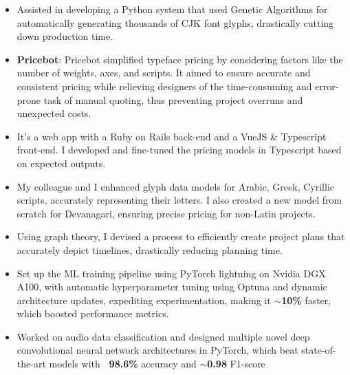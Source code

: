 \documentclass[10pt,a4paper,ragged2e,withhyper]{altacv}
\begin{document}
\begin{paracol}{2}

\begin{itemize}
    \item Assisted in developing a Python system that used Genetic Algorithms for automatically generating thousands of CJK font glyphs, drastically cutting down production time.
    \item \textbf{Pricebot}: Pricebot simplified typeface pricing by considering factors like the number of weights, axes, and scripts. It aimed to ensure accurate and consistent pricing while relieving designers of the time-consuming and error-prone task of manual quoting, thus preventing project overruns and unexpected costs.
    \item It's a web app with a Ruby on Rails back-end and a VueJS \& Typescript front-end. I developed and fine-tuned the pricing models in Typescript based on expected outputs.
    \item My colleague and I enhanced glyph data models for Arabic, Greek, Cyrillic scripts, accurately representing their letters. I also created a new model from scratch for Devanagari, ensuring precise pricing for non-Latin projects.
    \item Using graph theory, I devised a process to efficiently create project plans that accurately depict timelines, drastically reducing planning time.
\end{itemize}
\divider
{}
\begin{itemize}
    \item Set up the ML training pipeline using PyTorch lightning on Nvidia DGX A100, with automatic hyperparameter tuning using Optuna and dynamic architecture updates, expediting experimentation, making it \textbf{$\sim$10\%} faster, which boosted performance metrics.
\end{itemize}
\begin{itemize}
    \item Worked on audio data classification and designed multiple novel deep convolutional neural network architectures in PyTorch, which beat state-of-the-art models with \textbf{~98.6\%} accuracy and \textbf{$\sim$0.98} F1-score

\end{itemize}
\end{paracol}
\end{document}
